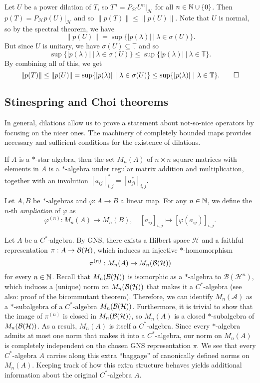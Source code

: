 \begin{myproof}
    Let $U$ be a power dilation of $T$, so $T^n = P_{\mathcal{H}} U^n \big|_{\mathcal{H}}$
    for all $n \in \mathbb {N} \cup\{0\}$. Then $p(T) = P_{\mathcal{H}} p(U)\big|_{\mathcal{H}}$
    and so $\| p(T)\| \leq \| p(U)\|$. Note that $U$ is normal, so by the spectral theorem, 
    we have $$\| p(U) \| = \sup \{|p(\lambda)|\ |\ \lambda \in \sigma(U)\}.$$
    But since $U$ is unitary, we have $\sigma(U) \subseteq \mathbb{T}$ and so
    $$\sup \{|p(\lambda)|\ |\ \lambda \in \sigma(U)\} \leq \sup \{|p(\lambda)|\ |\ \lambda \in \mathbb{T}\}.$$
    By combining all of this, we get 
    \begin{equation*}
        \| p(T)\| \leq \| p(U)\| = \sup \{|p(\lambda)|\ |\ \lambda \in \sigma(U)\} \leq \sup \{|p(\lambda)|\ |\ \lambda \in \mathbb{T}\}. \qedhere
    \end{equation*} 
\end{myproof}

\subsection{Stinespring and Choi theorems}

In general, dilations allow us to prove a statement about not-so-nice operators by focusing on the nicer ones.
The machinery of completely bounded maps provides necessary and sufficient conditions for the existence of dilations.

If $A$ is a $*$-star algebra, then the set $M_n (A)$ of $n \times n$ square matrices with elements in $A$ is a $*$-algebra 
under regular matrix addition and multiplication, together with an involution 
$[a_{ij}]_{i,j} ^* = [a_{ji} ^*]_{i,j}.$

\begin{definition}
    Let $A, B$ be $*$-algebras and $\varphi: A \to B$ a linear map.
    For any $n \in \mathbb {N}$, we define the $n$-th \emph{ampliation} of $\varphi$ as 
    $$\varphi^{(n)}: M_n (A) \to M_n (B),\quad [a_{ij}]_{i, j} \mapsto [\varphi(a_{ij})]_{i, j}.$$
\end{definition}

Let $A$ be a $C^*$-algebra. By GNS, there exists a Hilbert space $\mathcal{H}$ and a faithful representation
$\pi: A \to \operatorname{\mathcal{B} (\mathcal{H})}$, which induces an injective $*$-homomorphism 
$$\pi^{(n)}: M_n (A) \to M_n (\operatorname{\mathcal{B} (\mathcal{H})})$$ for every $n \in \mathbb {N}$.
Recall that $M_n (\operatorname{\mathcal{B} (\mathcal{H})})$ is isomorphic as a $*$-algebra to $\mathcal{B} (\mathcal{H}^n)$,
which induces a (unique) norm on $M_n (\operatorname{\mathcal{B} (\mathcal{H})})$ that makes it a $C^*$-algebra (see also: proof of the bicommutant theorem).
Therefore, we can identify $M_n (\mathcal{A})$ as a $*$-subalgebra of a $C^*$-algebra $M_n (\operatorname{\mathcal{B} (\mathcal{H})})$.
Furthermore, it is trivial to show that the image of $\pi^{(n)}$ is closed in $M_n (\operatorname{\mathcal{B} (\mathcal{H})})$,
so $M_n (A)$ is a closed $*$-subalgebra of $M_n (\operatorname{\mathcal{B} (\mathcal{H})})$. As a result, $M_n (A)$ is itself a $C^*$-algebra.
Since every $*$-algebra admits at most one norm that makes it into a $C^*$-algebra, 
our norm on $M_n (A)$ is completely independent on the chosen GNS representation $\pi$.
We see that every $C^*$-algebra $A$ carries along this extra ``baggage''
of canonically defined norms on $M_n (A)$. Keeping track of how this extra structure behaves yields additional information about the original $C^*$-algebra $A$.

